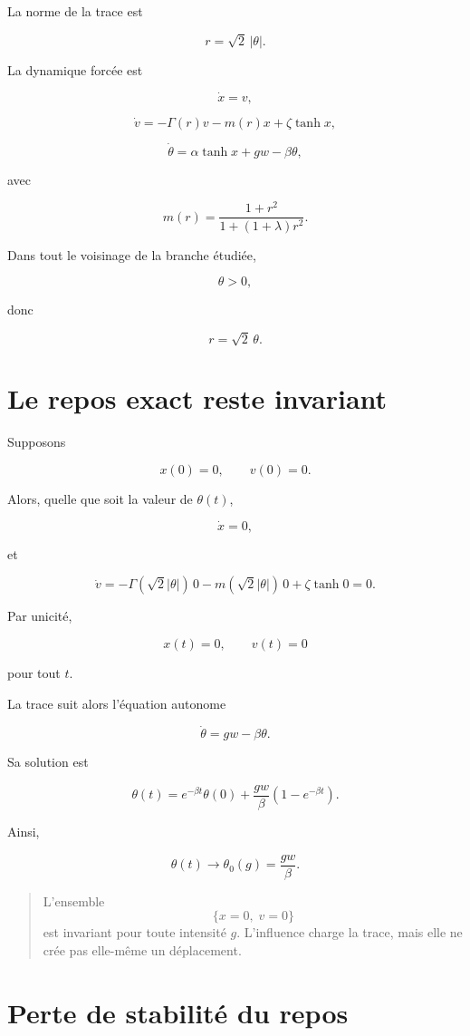 La norme de la trace est

\[
r=\sqrt2\,|\theta|.
\]

La dynamique forcée est

\[
\dot x=v,
\]

\[
\dot v
=
-\Gamma(r)v
-
m(r)x
+
\zeta\tanh x,
\]

\[
\dot\theta
=
\alpha\tanh x
+
gw
-
\beta\theta,
\]

avec

\[
m(r)
=
\frac{1+r^2}
{1+(1+\lambda)r^2}.
\]

Dans tout le voisinage de la branche étudiée,

\[
\theta>0,
\]

donc

\[
r=\sqrt2\,\theta.
\]

\section{Le repos exact reste invariant}
\label{annexe-resistance-repos-invariant}

Supposons

\[
x(0)=0,
\qquad
v(0)=0.
\]

Alors, quelle que soit la valeur de \(\theta(t)\),

\[
\dot x=0,
\]

et

\[
\dot v
=
-\Gamma(\sqrt2|\theta|)\,0
-
m(\sqrt2|\theta|)\,0
+
\zeta\tanh0
=
0.
\]

Par unicité,

\[
x(t)=0,
\qquad
v(t)=0
\]

pour tout \(t\).

La trace suit alors l'équation autonome

\[
\dot\theta
=
gw-\beta\theta.
\]

Sa solution est

\[
\theta(t)
=
e^{-\beta t}\theta(0)
+
\frac{gw}{\beta}
\left(
1-e^{-\beta t}
\right).
\]

Ainsi,

\[
\theta(t)
\longrightarrow
\theta_0(g)
=
\frac{gw}{\beta}.
\]

\begin{quote}
L'ensemble
\[
\{x=0,\;v=0\}
\]
est invariant pour toute intensité \(g\). L'influence charge la trace,
mais elle ne crée pas elle-même un déplacement.
\end{quote}

\section{Perte de stabilité du repos}
\label{annexe-resistance-gc}

